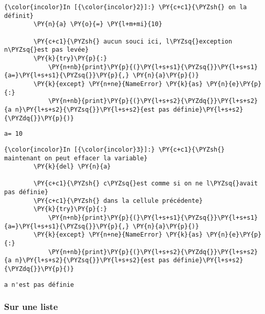     \begin{Verbatim}[commandchars=\\\{\},frame=single,framerule=0.3mm,rulecolor=\color{cellframecolor}]
{\color{incolor}In [{\color{incolor}2}]:} \PY{c+c1}{\PYZsh{} on la définit}
        \PY{n}{a} \PY{o}{=} \PY{l+m+mi}{10}
        
        \PY{c+c1}{\PYZsh{} aucun souci ici, l\PYZsq{}exception n\PYZsq{}est pas levée}
        \PY{k}{try}\PY{p}{:}
            \PY{n+nb}{print}\PY{p}{(}\PY{l+s+s1}{\PYZsq{}}\PY{l+s+s1}{a=}\PY{l+s+s1}{\PYZsq{}}\PY{p}{,} \PY{n}{a}\PY{p}{)}
        \PY{k}{except} \PY{n+ne}{NameError} \PY{k}{as} \PY{n}{e}\PY{p}{:}
            \PY{n+nb}{print}\PY{p}{(}\PY{l+s+s2}{\PYZdq{}}\PY{l+s+s2}{a n}\PY{l+s+s2}{\PYZsq{}}\PY{l+s+s2}{est pas définie}\PY{l+s+s2}{\PYZdq{}}\PY{p}{)}
\end{Verbatim}


    \begin{Verbatim}[commandchars=\\\{\},frame=single,framerule=0.3mm,rulecolor=\color{cellframecolor}]
a= 10
\end{Verbatim}

    \begin{Verbatim}[commandchars=\\\{\},frame=single,framerule=0.3mm,rulecolor=\color{cellframecolor}]
{\color{incolor}In [{\color{incolor}3}]:} \PY{c+c1}{\PYZsh{} maintenant on peut effacer la variable}
        \PY{k}{del} \PY{n}{a}
        
        \PY{c+c1}{\PYZsh{} c\PYZsq{}est comme si on ne l\PYZsq{}avait pas définie}
        \PY{c+c1}{\PYZsh{} dans la cellule précédente}
        \PY{k}{try}\PY{p}{:}
            \PY{n+nb}{print}\PY{p}{(}\PY{l+s+s1}{\PYZsq{}}\PY{l+s+s1}{a=}\PY{l+s+s1}{\PYZsq{}}\PY{p}{,} \PY{n}{a}\PY{p}{)}
        \PY{k}{except} \PY{n+ne}{NameError} \PY{k}{as} \PY{n}{e}\PY{p}{:}
            \PY{n+nb}{print}\PY{p}{(}\PY{l+s+s2}{\PYZdq{}}\PY{l+s+s2}{a n}\PY{l+s+s2}{\PYZsq{}}\PY{l+s+s2}{est pas définie}\PY{l+s+s2}{\PYZdq{}}\PY{p}{)}
\end{Verbatim}


    \begin{Verbatim}[commandchars=\\\{\},frame=single,framerule=0.3mm,rulecolor=\color{cellframecolor}]
a n'est pas définie
\end{Verbatim}

    \hypertarget{sur-une-liste}{%
\subsubsection{Sur une liste}\label{sur-une-liste}}

